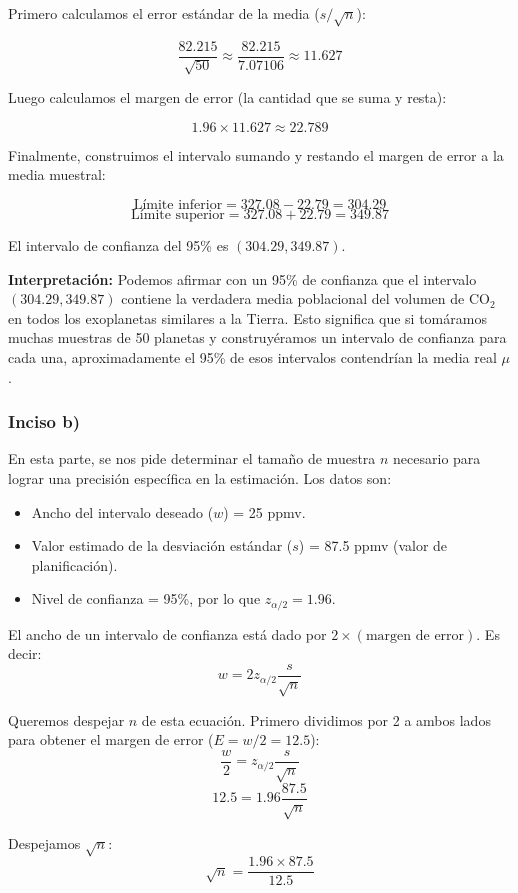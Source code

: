 \documentclass[12pt]{article}
\begin{document}
Primero calculamos el error estándar de la media ($s/\sqrt{n}$):

$$ \frac{82.215}{\sqrt{50}} \approx \frac{82.215}{7.07106} \approx 11.627 $$

Luego calculamos el margen de error (la cantidad que se suma y resta):

$$ 1.96 \times 11.627 \approx 22.789 $$

Finalmente, construimos el intervalo sumando y restando el margen de error a la media muestral:

$$ \text{Límite inferior} = 327.08 - 22.79 = 304.29 $$
$$ \text{Límite superior} = 327.08 + 22.79 = 349.87 $$

El intervalo de confianza del 95\% es $(304.29, 349.87)$.

\textbf{Interpretación:} Podemos afirmar con un 95\% de confianza que el intervalo $(304.29, 349.87)$ contiene la verdadera media poblacional del volumen de CO$_2$ en todos los exoplanetas similares a la Tierra. Esto significa que si tomáramos muchas muestras de 50 planetas y construyéramos un intervalo de confianza para cada una, aproximadamente el 95\% de esos intervalos contendrían la media real $\mu$.

\subsubsection{Inciso b)}
En esta parte, se nos pide determinar el tamaño de muestra $n$ necesario para lograr una precisión específica en la estimación. Los datos son:
\begin{itemize}
    \item Ancho del intervalo deseado ($w$) = 25 ppmv.
    \item Valor estimado de la desviación estándar ($s$) = 87.5 ppmv (valor de planificación).
    \item Nivel de confianza = 95\%, por lo que $z_{\alpha/2} = 1.96$.
\end{itemize}

El ancho de un intervalo de confianza está dado por $2 \times (\text{margen de error})$. Es decir:
$$ w = 2 z_{\alpha/2} \frac{s}{\sqrt{n}} $$

Queremos despejar $n$ de esta ecuación. Primero dividimos por 2 a ambos lados para obtener el margen de error ($E = w/2 = 12.5$):
$$ \frac{w}{2} = z_{\alpha/2} \frac{s}{\sqrt{n}} $$
$$ 12.5 = 1.96 \frac{87.5}{\sqrt{n}} $$

Despejamos $\sqrt{n}$:
$$ \sqrt{n} = \frac{1.96 \times 87.5}{12.5} $$
\end{document}
